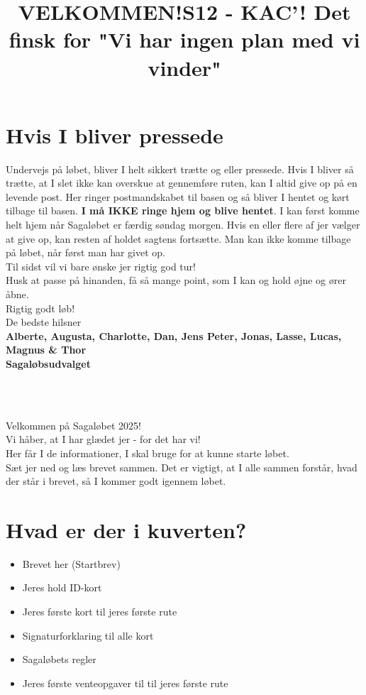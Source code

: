 \section{Hvis I bliver pressede}
Undervejs på løbet, bliver I helt sikkert trætte og eller pressede. Hvis I bliver så trætte, at I slet ikke kan overskue at gennemføre ruten, kan I altid give op på en levende post. Her ringer postmandskabet til basen og så bliver I hentet og kørt tilbage til basen. \textbf{I må IKKE ringe hjem og blive hentet}. I kan først komme helt hjem når Sagaløbet er færdig søndag morgen. Hvis en eller flere af jer vælger at give op, kan resten af holdet sagtens fortsætte. Man kan ikke komme tilbage på løbet, når først man har givet op.\\
\newline
Til sidst vil vi bare ønske jer rigtig god tur!\\
Husk at passe på hinanden, få så mange point, som I kan og hold øjne og ører åbne.\\
\newline
Rigtig godt løb!\\
\newline
\textcolor{søblå}{De bedste hilsner}\\
\textcolor{natblå}{\textbf{Alberte, Augusta, Charlotte, Dan, Jens Peter, Jonas, Lasse, Lucas, Magnus \& Thor}}\\
\textcolor{natblå}{\textbf{Sagaløbsudvalget}}\\
\newpage
\title{VELKOMMEN!}\\
\newline
\title{\textcolor{flammefarvet}{S12 - KAC'! Det finsk for "Vi har ingen plan med vi vinder" }}\\
\newline
Velkommen på Sagaløbet 2025!\\
Vi håber, at I har glædet jer - for det har vi!\\
Her får I de informationer, I skal bruge for at kunne starte løbet.\\
Sæt jer ned og læs brevet sammen. Det er vigtigt, at I alle sammen forstår, hvad der står i brevet, så I kommer godt igennem løbet.
\section{Hvad er der i kuverten?}
\begin{itemize}
    \item Brevet her (Startbrev)
    \item Jeres hold ID-kort
    \item Jeres første kort til jeres første rute
    \item Signaturforklaring til alle kort
    \item Sagaløbets regler
    \item Jeres første venteopgaver til til jeres første rute
\end{itemize}
